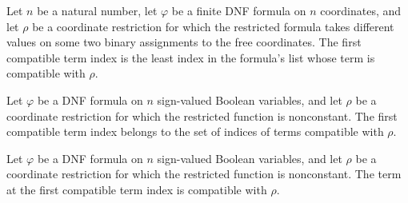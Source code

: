 \begin{definition}
\label{FABL.DNFFormula.firstCompatibleTermIndex}
\leanok
{}
Let $n$ be a natural number, let $\varphi$ be a finite DNF formula on $n$ coordinates,
and let $\rho$ be a coordinate restriction for which the restricted formula takes
different values on some two binary assignments to the free coordinates. The first
compatible term index is the least index in the formula's list whose term is compatible
with $\rho$.
\end{definition}

\begin{theorem}
\label{FABL.DNFFormula.firstCompatibleTermIndex_mem}
\leanok
{}
Let $\varphi$ be a DNF formula on $n$ sign-valued Boolean variables, and let $\rho$ be a
coordinate restriction for which the restricted function is nonconstant. The first
compatible term index belongs to the set of indices of terms compatible with $\rho$.
\end{theorem}

\begin{theorem}
\label{FABL.DNFFormula.firstCompatibleTerm_compatible}
\leanok
{}
Let $\varphi$ be a DNF formula on $n$ sign-valued Boolean variables, and let $\rho$ be a
coordinate restriction for which the restricted function is nonconstant. The term at the
first compatible term index is compatible with $\rho$.
\end{theorem}

